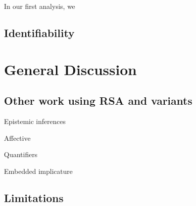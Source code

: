 \documentclass[man,noapacite]{apa2}
\begin{document}
In our first analysis, we


\subsection{Identifiability}

\section{General Discussion}
\label{sec:discussion}


\subsection{Other work using RSA and variants}

Epistemic inferences \cite{goodman2013}

Affective \cite{kao2014}


Quantifiers \cite{franke2013}


Embedded implicature \cite{pottsunderreview}

\subsection{Limitations}



\newpage




\newpage
\end{document}

